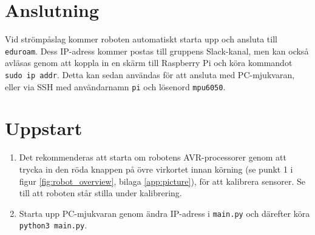 \documentclass[a4paper,11pt]{article}
\begin{document}
\pagestyle{intro}
\LIPStitelsida
\clearpage
\begin{LIPSprojektidentitet}
\end{LIPSprojektidentitet}

\clearpage
\renewcommand{\familydefault}{\sfdefault}	%
\normalfont
\tableofcontents
\renewcommand{\familydefault}{\rmdefault}	%
\normalfont
\clearpage
\begin{LIPSdokumenthistorik}
\end{LIPSdokumenthistorik}
\clearpage
\setcounter{page}{1}
\pagestyle{content}

\section{Anslutning}
Vid strömpåslag kommer roboten automatiskt starta upp och ansluta till \texttt{eduroam}. Dess IP-adress kommer postas till gruppens Slack-kanal, men kan också avläsas genom att koppla in en skärm till Raspberry Pi och köra kommandot \texttt{sudo ip addr}. Detta kan sedan användas för att ansluta med PC-mjukvaran, eller via SSH med användarnamn \texttt{pi} och lösenord \texttt{mpu6050}.

\section{Uppstart}
\begin{enumerate}
    \item Det rekommenderas att starta om robotens AVR-processorer genom att trycka in den röda knappen på övre virkortet innan körning (se punkt 1 i figur \ref{fig:robot_overview}, bilaga \ref{app:picture}), för att kalibrera sensorer. Se till att roboten står stilla under kalibrering.
    
    \item Starta upp PC-mjukvaran genom ändra IP-adress i \texttt{main.py} och därefter köra \texttt{python3 main.py}. 
\end{enumerate}
\end{document}
